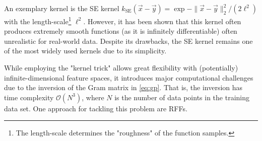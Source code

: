 	An exemplary kernel is the \ac{SE} kernel \( k_\mathrm{SE}(\vec{x} - \vec{y}) = \exp{ -\lVert \vec{x} - \vec{y} \rVert_2^2 / (2 \ell^2) } \) with the length-scale\footnote{The length-scale determines the "roughness" of the function samples\cite[p.\,15]{rasmussenGaussianProcessesMachine2006}.} \(\ell^2\).
	However, it has been shown that this kernel often produces extremely smooth functions (as it is infinitely differentiable) often unrealistic for real-world data\cite{steinInterpolationSpatialData1999}.
	Despite its drawbacks, the \ac{SE} kernel remains one of the most widely used kernels due to its simplicity\cite[p.\,83]{rasmussenGaussianProcessesMachine2006}.

	While employing the "kernel trick" allows great flexibility with (potentially) infinite-dimensional feature spaces, it introduces major computational challenges due to the inversion of the Gram matrix in \cref{eq:gp}.
	That is, the inversion has time complexity \( \mathcal{O}(N^3) \), where \(N\) is the number of data points in the training data set.
	One approach for tackling this problem are \aclp{RFF}.
